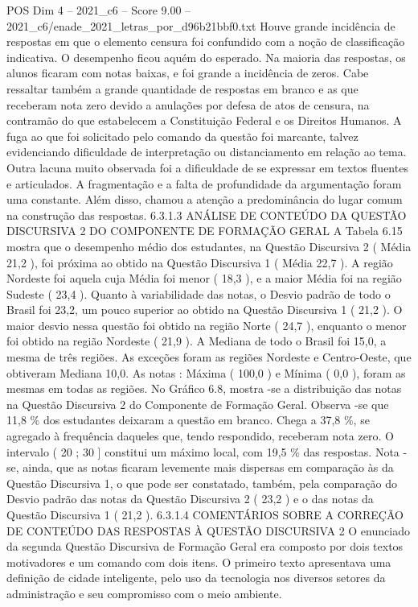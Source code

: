 \begin{textsample}{POS Dim 4 – 2021\_c6 – Score 9.00 – 2021\_c6/enade\_2021\_letras\_por\_d96b21bbf0.txt}
Houve grande incidência de respostas em que o elemento censura foi confundido com a noção de classificação indicativa.
O desempenho ficou aquém do esperado.
Na maioria das respostas, os alunos ficaram com notas baixas, e foi grande a incidência de zeros.
Cabe ressaltar também a grande quantidade de respostas em branco e as que receberam nota zero devido a anulações por defesa de atos de censura, na contramão do que estabelecem a Constituição Federal e os Direitos Humanos.
A fuga ao que foi solicitado pelo comando da questão foi marcante, talvez evidenciando dificuldade de interpretação ou distanciamento em relação ao tema.
Outra lacuna muito observada foi a dificuldade de se expressar em textos fluentes e articulados.
A fragmentação e a falta de profundidade da argumentação foram uma constante.
Além disso, chamou a atenção a predominância do lugar comum na construção das respostas. 6.3.1.3 ANÁLISE DE CONTEÚDO DA QUESTÃO DISCURSIVA 2 DO COMPONENTE DE FORMAÇÃO GERAL A Tabela 6.15 mostra que o desempenho médio dos estudantes, na Questão Discursiva 2 ( Média 21,2 ), foi próxima ao obtido na Questão Discursiva 1 ( Média 22,7 ).
A região Nordeste foi aquela cuja Média foi menor ( 18,3 ), e a maior Média foi na região Sudeste ( 23,4 ).
Quanto à variabilidade das notas, o Desvio padrão de todo o Brasil foi 23,2, um pouco superior ao obtido na Questão Discursiva 1 ( 21,2 ).
O maior desvio nessa questão foi obtido na região Norte ( 24,7 ), enquanto o menor foi obtido na região Nordeste ( 21,9 ).
A Mediana de todo o Brasil foi 15,0, a mesma de três regiões.
As exceções foram as regiões Nordeste e Centro-Oeste, que obtiveram Mediana 10,0.
As notas : Máxima ( 100,0 ) e Mínima ( 0,0 ), foram as mesmas em todas as regiões.
No Gráfico 6.8, mostra -se a distribuição das notas na Questão Discursiva 2 do Componente de Formação Geral.
Observa -se que 11,8 \% dos estudantes deixaram a questão em branco.
Chega a 37,8 \%, se agregado à frequência daqueles que, tendo respondido, receberam nota zero.
O intervalo ( 20 ; 30 ] constitui um máximo local, com 19,5 \% das respostas.
Nota -se, ainda, que as notas ficaram levemente mais dispersas em comparação às da Questão Discursiva 1, o que pode ser constatado, também, pela comparação do Desvio padrão das notas da Questão Discursiva 2 ( 23,2 ) e o das notas da Questão Discursiva 1 ( 21,2 ). 6.3.1.4 COMENTÁRIOS SOBRE A CORREÇÃO DE CONTEÚDO DAS RESPOSTAS À QUESTÃO DISCURSIVA 2 O enunciado da segunda Questão Discursiva de Formação Geral era composto por dois textos motivadores e um comando com dois itens.
O primeiro texto apresentava uma definição de cidade inteligente, pelo uso da tecnologia nos diversos setores da administração e seu compromisso com o meio ambiente.

\end{textsample}
